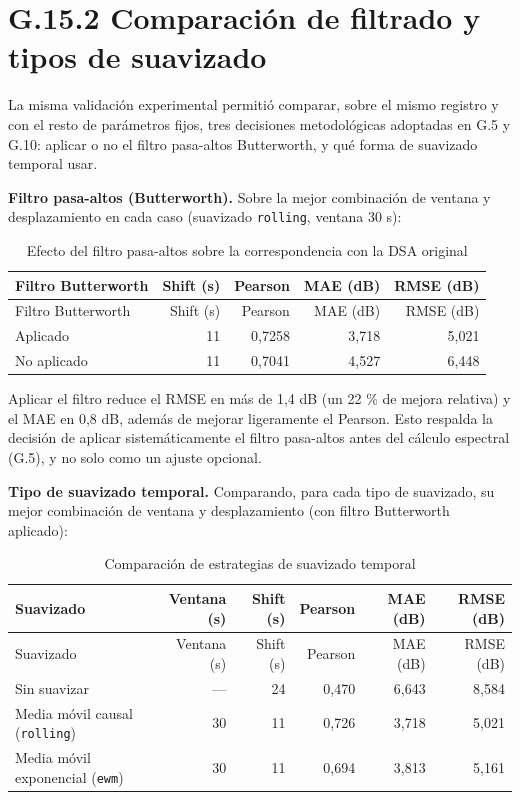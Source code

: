 \documentclass[
  spanish,
  a4paper,
  12pt,
  twoside]{memoir}
\begin{document}
\section{G.15.2 Comparación de filtrado y tipos de
suavizado}\label{g.15.2-comparaciuxf3n-de-filtrado-y-tipos-de-suavizado}

La misma validación experimental permitió comparar, sobre el mismo
registro y con el resto de parámetros fijos, tres decisiones
metodológicas adoptadas en G.5 y G.10: aplicar o no el filtro pasa-altos
Butterworth, y qué forma de suavizado temporal usar.

\textbf{Filtro pasa-altos (Butterworth).} Sobre la mejor combinación de
ventana y desplazamiento en cada caso (suavizado \texttt{rolling},
ventana 30 s):

\begin{longtable}[]{@{}lrrrr@{}}
\caption{Efecto del filtro pasa-altos sobre la correspondencia con la
DSA original}\label{tbl-butterworth-comparacion}\tabularnewline
\toprule\noalign{}
Filtro Butterworth & Shift (s) & Pearson & MAE (dB) & RMSE (dB) \\
\midrule\noalign{}
\endfirsthead
\toprule\noalign{}
Filtro Butterworth & Shift (s) & Pearson & MAE (dB) & RMSE (dB) \\
\midrule\noalign{}
\endhead
\bottomrule\noalign{}
\endlastfoot
Aplicado & 11 & 0,7258 & 3,718 & 5,021 \\
No aplicado & 11 & 0,7041 & 4,527 & 6,448 \\
\end{longtable}

Aplicar el filtro reduce el RMSE en más de 1,4 dB (un 22 \% de mejora
relativa) y el MAE en 0,8 dB, además de mejorar ligeramente el Pearson.
Esto respalda la decisión de aplicar sistemáticamente el filtro
pasa-altos antes del cálculo espectral (G.5), y no solo como un ajuste
opcional.

\textbf{Tipo de suavizado temporal.} Comparando, para cada tipo de
suavizado, su mejor combinación de ventana y desplazamiento (con filtro
Butterworth aplicado):

\begin{longtable}[]{@{}lrrrrr@{}}
\caption{Comparación de estrategias de suavizado
temporal}\label{tbl-suavizado-comparacion}\tabularnewline
\toprule\noalign{}
Suavizado & Ventana (s) & Shift (s) & Pearson & MAE (dB) & RMSE (dB) \\
\midrule\noalign{}
\endfirsthead
\toprule\noalign{}
Suavizado & Ventana (s) & Shift (s) & Pearson & MAE (dB) & RMSE (dB) \\
\midrule\noalign{}
\endhead
\bottomrule\noalign{}
\endlastfoot
Sin suavizar & --- & 24 & 0,470 & 6,643 & 8,584 \\
Media móvil causal (\texttt{rolling}) & 30 & 11 & 0,726 & 3,718 &
5,021 \\
Media móvil exponencial (\texttt{ewm}) & 30 & 11 & 0,694 & 3,813 &
5,161 \\
\end{longtable}
\end{document}
